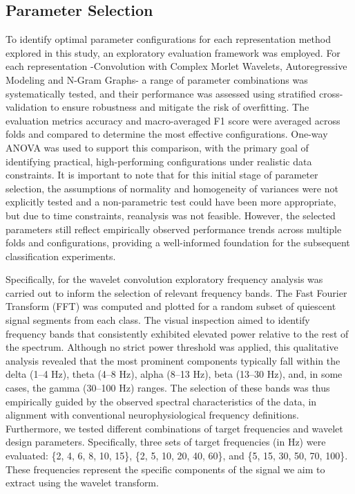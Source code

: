 \documentclass{article}
\begin{document}
\subsection{Parameter Selection}

To identify optimal parameter configurations for each representation method explored in this study, an exploratory evaluation framework was employed. For each representation -Convolution with Complex Morlet Wavelets, Autoregressive Modeling and N-Gram Graphs- a range of parameter combinations was systematically tested, and their performance was assessed using stratified cross-validation to ensure robustness and mitigate the risk of overfitting. The evaluation metrics accuracy and macro-averaged F1 score were averaged across folds and compared to determine the most effective configurations. One-way ANOVA was used to support this comparison, with the primary goal of identifying practical, high-performing configurations under realistic data constraints. It is important to note that for this initial stage of parameter selection, the assumptions of normality and homogeneity of variances were not explicitly tested and a non-parametric test could have been more appropriate, but due to time constraints, reanalysis was not feasible. However, the selected parameters still reflect empirically observed performance trends across multiple folds and configurations, providing a well-informed foundation for the subsequent classification experiments.
	
Specifically, for the wavelet convolution exploratory frequency analysis was carried out to inform the selection of relevant frequency bands. The Fast Fourier Transform (FFT) was computed and plotted for a random subset of quiescent signal segments from each class. The visual inspection aimed to identify frequency bands that consistently exhibited elevated power relative to the rest of the spectrum. Although no strict power threshold was applied, this qualitative analysis revealed that the most prominent components typically fall within the delta (1–4 Hz), theta (4–8 Hz), alpha (8–13 Hz), beta (13–30 Hz), and, in some cases, the gamma (30–100 Hz) ranges. The selection of these bands was thus empirically guided by the observed spectral characteristics of the data, in alignment with conventional neurophysiological frequency definitions. Furthermore, we tested different combinations of target frequencies and wavelet design parameters. Specifically, three sets of target frequencies (in Hz) were evaluated: \{2, 4, 6, 8, 10, 15\}, \{2, 5, 10, 20, 40, 60\}, and \{5, 15, 30, 50, 70, 100\}. These frequencies represent the specific components of the signal we aim to extract using the wavelet transform.
\end{document}
